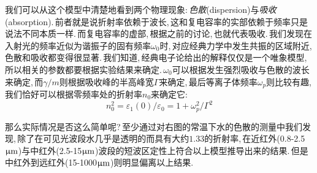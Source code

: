 我们可以从这个模型中清楚地看到两个物理现象:\,\emph{色散}(dispersion)与\emph{吸收}(absorption).\,前者就是说折射率依赖于波长,\,这和复电容率的实部依赖于频率只是说法不同本质一样.\,而复电容率的虚部,\,根据之前的讨论,\,也就代表吸收.\,我们发现在入射光的频率近似为谐振子的固有频率$\omega_0$时,\,对应经典力学中发生共振的区域附近,\,色散和吸收都变得很显著.\,我们知道,\,经典电子论给出的解释仅仅是一个唯象模型,\,所以相关的参数都要根据实验结果来确定.\,$\omega_0$可以根据发生强烈吸收与色散的波长来确定,\,而$\gamma/m$则根据吸收峰的半高峰宽$\Gamma$来确定,\,最后等离子体频率$\omega_p$则比较有趣,\,我们恰好可以根据零频率处的折射率$n_0$来确定它:
\[n_0^2=\varepsilon_1(0)/\varepsilon_0=1+\omega_p^2/\Gamma^2\]


那么实际情况是否这么简单呢?\,至少通过对右图的常温下水的色散的测量中我们发现,\,除了在可见光波段水几乎是透明的而具有大约$1.33$的折射率,\,在近红外(0.8-2.5${\rm \upmu m}$)与中红外(2.5-15${\rm \upmu m}$)波段的短波区定性上符合以上模型推导出来的结果.\,但是中红外到远红外(15-1000${\rm \upmu m}$)则明显偏离以上结果.
